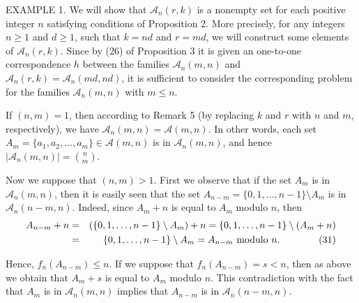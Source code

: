 \documentclass[12pt]{amsart}
\begin{document}
{\vspace{2mm}

E{\scriptsize XAMPLE} 1.  We will show that ${\mathcal A}_n(r,k)$ is a  nonempty 
set for each positive integer $n$ satisfying conditions of Proposition
2. More precisely, for any integers $n\ge 1$ and $d\ge 1$, 
such that $k=nd$ and $r=md$, we will construct some elements of 
${\mathcal A}_n(r,k)$. 
Since by (26) of Proposition 3 it is given  an one-to-one
correspondence $h$ between the families ${\mathcal A}_n(m,n)$  
and ${\mathcal A}_n(r,k)={\mathcal A}_n(md,nd)$,
it is sufficient to consider the corresponding problem for the
families ${\mathcal A}_n(m,n)$ with $m\le n$. 

If $(n,m)=1$, then according to  Remark 5
(by replacing $k$ and $r$ with $n$ and $m$,
respectively), we have ${\mathcal A}_n(m,n)={\mathcal A}(m,n)$. 
In other words, each set $A_m=\{a_1,a_2,\ldots,a_m\}\in {\mathcal A}(m,n)$
is in ${\mathcal A}_n(m,n)$, and hence $\left|{\mathcal A}_n(m,n)\right|={n\choose m}$.

Now we suppose that $(n,m)>1$.  
First we observe that if
the set $A_m$ is in ${\mathcal A}_n(m,n)$, then it is easily seen that the  
 set $A_{n-m}=\{0,1,\ldots,n-1\}\setminus A_m$ is in 
${\mathcal A}_{n}(n-m,n)$. Indeed, since $A_m+n$ is equal to $A_m$ modulo $n$,
then 
    \begin{eqnarray*}
A_{n-m}+n &=&(\{0,1,\ldots,n-1\}\setminus A_m)+n=
\{0,1,\ldots,n-1\}\setminus (A_m+n)\\
\qquad&=&\{0,1,\ldots,n-1\}\setminus A_m=A_{n-m}\,\,{\rm modulo}\,\, n.\qquad\qquad (31)
\end{eqnarray*}

Hence, $f_n(A_{n-m})\le n$. If we suppose that $f_n(A_{n-m})=s<n$,
then as above we obtain that  $A_m+s$ is equal to $A_m$ modulo $n$.
This contradiction with the fact that $A_m$ is in ${\mathcal A}_n(m,n)$
implies that $A_{n-m}$ is in ${\mathcal A}_{n}(n-m,n)$.

}
\end{document}
